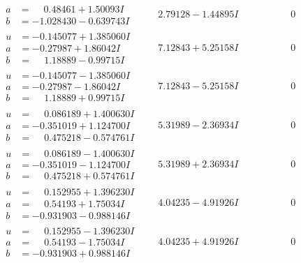 \documentclass[1p]{elsarticle_modified}
\theoremstyle{definition}
\begin{document}
$$\begin{array}{c|c|c}
\begin{aligned}
a &= \phantom{-}0.48461 + 1.50093 I \\
b &= -1.028430 - 0.639743 I\end{aligned}
 & \phantom{-}2.79128 - 1.44895 I & \phantom{-0.000000 } 0 \\ \hline\begin{aligned}
u &= -0.145077 + 1.385060 I \\
a &= -0.27987 + 1.86042 I \\
b &= \phantom{-}1.18889 - 0.99715 I\end{aligned}
 & \phantom{-}7.12843 + 5.25158 I & \phantom{-0.000000 } 0 \\ \hline\begin{aligned}
u &= -0.145077 - 1.385060 I \\
a &= -0.27987 - 1.86042 I \\
b &= \phantom{-}1.18889 + 0.99715 I\end{aligned}
 & \phantom{-}7.12843 - 5.25158 I & \phantom{-0.000000 } 0 \\ \hline\begin{aligned}
u &= \phantom{-}0.086189 + 1.400630 I \\
a &= -0.351019 + 1.124700 I \\
b &= \phantom{-}0.475218 - 0.574761 I\end{aligned}
 & \phantom{-}5.31989 - 2.36934 I & \phantom{-0.000000 } 0 \\ \hline\begin{aligned}
u &= \phantom{-}0.086189 - 1.400630 I \\
a &= -0.351019 - 1.124700 I \\
b &= \phantom{-}0.475218 + 0.574761 I\end{aligned}
 & \phantom{-}5.31989 + 2.36934 I & \phantom{-0.000000 } 0 \\ \hline\begin{aligned}
u &= \phantom{-}0.152955 + 1.396230 I \\
a &= \phantom{-}0.54193 + 1.75034 I \\
b &= -0.931903 - 0.988146 I\end{aligned}
 & \phantom{-}4.04235 - 4.91926 I & \phantom{-0.000000 } 0 \\ \hline\begin{aligned}
u &= \phantom{-}0.152955 - 1.396230 I \\
a &= \phantom{-}0.54193 - 1.75034 I \\
b &= -0.931903 + 0.988146 I\end{aligned}
 & \phantom{-}4.04235 + 4.91926 I & \phantom{-0.000000 } 0\\

\end{array}$$
\end{document}
